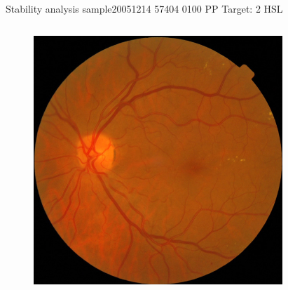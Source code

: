 \documentclass{beamer}
\begin{document}
\begin{frame}{Stability analysis sample}{20051214 57404 0100 PP Target: 2 HSL}
\begin{columns}
	\begin{column}{0.3\textwidth}
		\begin{figure}[p]
			\centering
			\includegraphics[width=\textwidth]{chapter_stability/20051214_57404_0100_PP/20051214_57404_0100_PP.jpeg}
		\end{figure}	
	\end{column}
	\begin{column}{0.45\textwidth}  %
		\begin{figure}[p]
			\centering

\end{figure}
\end{column}
\end{columns}
\end{frame}
\end{document}

